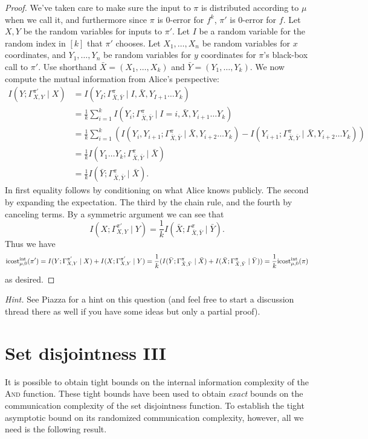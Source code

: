 \begin{proof}
We've taken care to make sure the input to $\pi$ is distributed according to $\mu$ when we call it, and furthermore since $\pi$ is $0$-error for $f^k$, $\pi'$ is $0$-error for $f$. Let $X,Y$ be the random variables for inputs to $\pi'$. Let $I$ be a random variable for the random index in $[k]$ that $\pi'$ chooses. Let $X_1,\dots, X_n$ be random variables for $x$ coordinates, and $Y_1,\dots, Y_n$ be random variables for $y$ coordinates for $\pi$'s black-box call to $\pi'$. Use shorthand $\bar{X} = (X_1,\dots, X_k)$ and $\bar{Y} = (Y_1,\dots, Y_k)$. We now compute the mutual information from Alice's perspective:
\begin{align*}
I(Y;\Gamma^{\pi'}_{X,Y}\mid X) &= I(Y_I;\Gamma^\pi_{\bar{X},\bar{Y}} \mid I, \bar{X}, Y_{I+1} \dots Y_{k}) \\
&= \frac{1}{k}\sum_{i=1}^kI(Y_i; \Gamma^\pi_{\bar{X},\bar{Y}}\mid I=i, \bar{X}, Y_{i+1}\dots Y_{k}) \\
&= \frac{1}{k}\sum_{i=1}^k \left(I(Y_i,Y_{i+1}; \Gamma^\pi_{\bar{X},\bar{Y}}\mid \bar{X}, Y_{i+2}\dots Y_{k}) - I(Y_{i+1}; \Gamma^\pi_{\bar{X},\bar{Y}}\mid \bar{X}, Y_{i+2}\dots Y_k)\right) \\
&= \frac{1}{k}I(Y_1\dots Y_k ; \Gamma^\pi_{\bar{X},\bar{Y}}\mid \bar{X}) \\
&= \frac{1}{k}I(\bar{Y};\Gamma^\pi_{\bar{X},\bar{Y}}\mid \bar{X}).
\end{align*}
In first equality follows by conditioning on what Alice knows publicly. The second by expanding the expectation. The third by the chain rule, and the fourth by canceling terms. By a symmetric argument we can see that
$$I(X;\Gamma^{\pi'}_{X,Y}\mid Y) = \frac{1}{k}I(\bar{X};\Gamma^\pi_{\bar{X},\bar{Y}}\mid \bar{Y}).$$
Thus we have
$$\mathrm{icost}^{\mathrm{int}}_{\mu,0}(\pi') = I(Y;\Gamma^{\pi'}_{X,Y}\mid X) + I(X;\Gamma^{\pi'}_{X,Y}\mid Y) = \frac{1}{k}(I(\bar{Y};\Gamma^\pi_{\bar{X},\bar{Y}}\mid \bar{X}) + I(\bar{X};\Gamma^\pi_{\bar{X},\bar{Y}}\mid \bar{Y})) =  \frac{1}{k}\mathrm{icost}^{\mathrm{int}}_{\mu,0}(\pi)$$
as desired.
\end{proof}

\bigskip
\noindent \emph{Hint.} See Piazza for a hint on this question (and feel free to start a discussion thread there as well if you have some ideas but only a partial proof).


\newpage 
\section{Set disjointness III}

It is possible to obtain tight bounds on the internal information complexity of the \textsc{And} function. These tight bounds have been used to obtain \emph{exact} bounds on the communication complexity of the set disjointness function. To establish the tight asymptotic bound on its randomized communication complexity, however, all we need is the following result.

